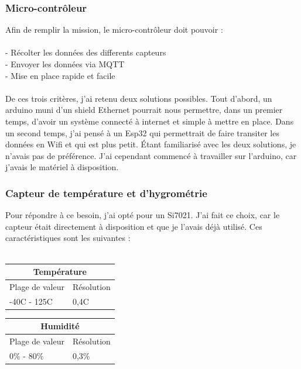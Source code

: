 \documentclass[12pt,french,a4paper]{article}
\begin{document}
\subsubsection{Micro-contrôleur}

Afin de remplir la mission, le micro-contrôleur doit pouvoir :\\
\\
	- Récolter les données des differents capteurs\\
	- Envoyer les données via MQTT\\
	- Mise en place rapide et facile\\
	\\
De ces trois critères, j'ai retenu deux solutions possibles. 
Tout d'abord, un arduino muni d'un shield Ethernet pourrait nous permettre, dans un premier temps, d'avoir un système 
connecté à internet et simple à mettre en place.
Dans un second temps, j'ai pensé à un Esp32 qui permettrait de faire transiter les données en Wifi et qui est plus petit. 
Étant familiarisé avec les deux solutions, je n'avais pas de préférence. J'ai cependant commencé à travailler sur l'arduino, car j'avais le matériel à disposition.

\subsubsection{Capteur de température et d'hygrométrie }
Pour répondre à ce besoin, j'ai opté pour un Si7021. J'ai fait ce choix, car le capteur était directement à disposition et que je l'avais déjà utilisé. Ces caractéristiques sont les suivantes :\\
\\
\begin{center}
    \begin{tabular}{|l|l|}
	\hline
	    \multicolumn{2}{|c|}{Température} \\
	\hline
	    Plage de valeur & Résolution \\
	\hline
	    -40C - 125C & 0,4C \\
	\hline
    \end{tabular}
\end{center}
\begin{center}
    \begin{tabular}{|l|l|}
	\hline
	    \multicolumn{2}{|c|}{Humidité} \\
	\hline
	    Plage de valeur & Résolution \\
	\hline
	    0\% - 80\% & 0,3\% \\
	\hline
    \end{tabular}
\end{center}
\end{document}
